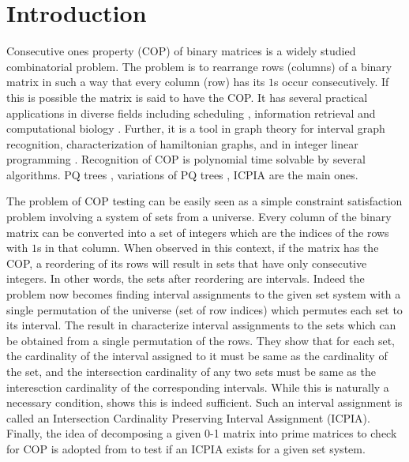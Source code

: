 \documentclass[11pt,letter]{../lib/llncs}
\def\xnoindent{\noindent} %
\begin{document}
\section{Introduction}
\xnoindent Consecutive ones property (COP) of binary matrices is a
widely studied combinatorial problem. The problem is to rearrange rows
(columns) of a binary matrix in such a way that every column (row) has
its $1$s occur consecutively. If this is possible the matrix is said
to have the COP.  It has several practical applications in diverse
fields including scheduling \cite{hl06}, information retrieval
\cite{k77} and computational biology \cite{abh98}.  Further, it is a
tool in graph theory \cite{mcg04} for interval graph recognition,
characterization of hamiltonian graphs, and in integer linear
programming \cite{ht02,hl06}.  Recognition of COP is polynomial time
solvable by several algorithms. PQ trees \cite{bl76}, variations of PQ
trees \cite{mm09,wlh01,wlh02,mcc04}, ICPIA \cite{nsnrs09} are the
main ones.

\xnoindent
The problem of COP testing can be easily seen as a simple constraint
satisfaction problem involving a system of sets from a universe. Every
column of the binary matrix can be converted into a set of integers
which are the indices of the rows with $1$s in that column. When
observed in this context, if the matrix has the COP, a reordering of
its rows will result in sets that have only consecutive integers. In
other words, the sets after reordering are intervals. Indeed the
problem now becomes finding interval assignments to the given set
system \cite{nsnrs09} with a single permutation of the universe (set
of row indices) which permutes each set to its interval. The result in
\cite{nsnrs09} characterize interval assignments to the sets which can
be obtained from a single permutation of the rows.  They show that for
each set, the cardinality of the interval assigned to it must be same
as the cardinality of the set, and the intersection cardinality of any
two sets must be same as the interesction cardinality of the
corresponding intervals.  While this is naturally a necessary
condition, \cite{nsnrs09} shows this is indeed sufficient.  Such an
interval assignment is called an Intersection Cardinality Preserving
Interval Assignment (ICPIA).  Finally, the idea of decomposing a given
0-1 matrix into prime matrices to check for COP is adopted from
\cite{wlh02} to test if an ICPIA exists for a given set system.\\
\end{document}
